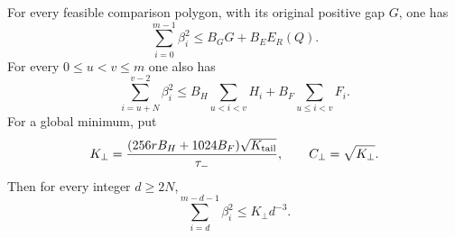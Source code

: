 \begin{theorem}
\label{thm:tb-budget}
For every feasible comparison polygon, with its original positive
gap $G$, one has
\begin{equation}\label{eq:tb-global-budget}
 \sum_{i=0}^{m-1}\beta_i^2\le B_GG+B_EE_R(Q).
\end{equation}
For every $0\le u<v\le m$ one also has
\begin{equation}\label{eq:tb-local-budget}
 \sum_{i=u+N}^{v-2}\beta_i^2
 \le B_H\sum_{u<i<v}H_i+B_F\sum_{u\le i<v}F_i.
\end{equation}
For a global minimum, put
\begin{equation}\label{eq:tb-depth-constants}
 K_\perp=\frac{(256rB_H+1024B_F)\sqrt{K_{\rm tail}}}{\tau_-},
 \qquad C_\perp=\sqrt{K_\perp}.
\end{equation}
Then for every integer $d\ge2N$,
\begin{equation}\label{eq:tb-depth-budget}
 \sum_{i=d}^{m-d-1}\beta_i^2\le K_\perp d^{-3}.
\end{equation}
\end{theorem}
